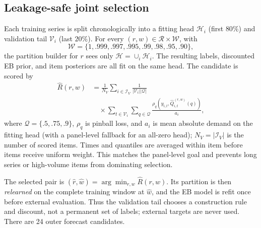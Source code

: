 \documentclass[twocolumn,10pt]{article}
\theoremstyle{definition}
\begin{document}
\subsection{Leakage-safe joint selection}\label{sec:select}

Each training series is split chronologically into a fitting head
$\mathcal H_i$ (first $80\%$) and validation tail $\mathcal V_i$ (last
$20\%$). For every $(r,w)\in\mathcal R\times\mathcal W$, with
\[
\mathcal W=\{1,.999,.997,.995,.99,.98,.95,.90\},
\]
the partition builder for $r$ sees only $\mathcal H=\cup_i\mathcal H_i$.
The resulting labels, discounted EB prior, and item posteriors are all
fit on the same head. The candidate is scored by
\begin{equation}
\begin{aligned}
\widehat R(r,w)
&=\frac{1}{N_{\!V}}\sum_{i\in\mathcal I_V}
  \frac{1}{|\mathcal V_i||\mathcal Q|}\\[-0.25em]
&\quad\times
  \sum_{t\in\mathcal V_i}\sum_{q\in\mathcal Q}
  \frac{\rho_q(y_{i,t},\widehat Q_{i,t}^{(r,w)}(q))}{a_i},
\end{aligned}
\label{eq:selection-risk}
\end{equation}
where $\mathcal Q=\{.5,.75,.9\}$, $\rho_q$ is pinball loss, and $a_i$
is mean absolute demand on the fitting head (with a panel-level fallback
for an all-zero head); $N_V=|\mathcal I_V|$ is the number of scored
items. Times and quantiles are averaged within item
before items receive uniform weight. This matches the panel-level goal
and prevents long series or high-volume items from dominating selection.

The selected pair is
$(\hat r,\hat w)=\arg\min_{r,w}\widehat R(r,w)$. Its partition is then
\emph{relearned} on the complete training window at $\hat w$, and the EB
model is refit once before external evaluation. Thus the validation tail
chooses a construction rule and discount, not a permanent set of labels;
external targets are never used. There are 24 outer forecast candidates.
\end{document}
